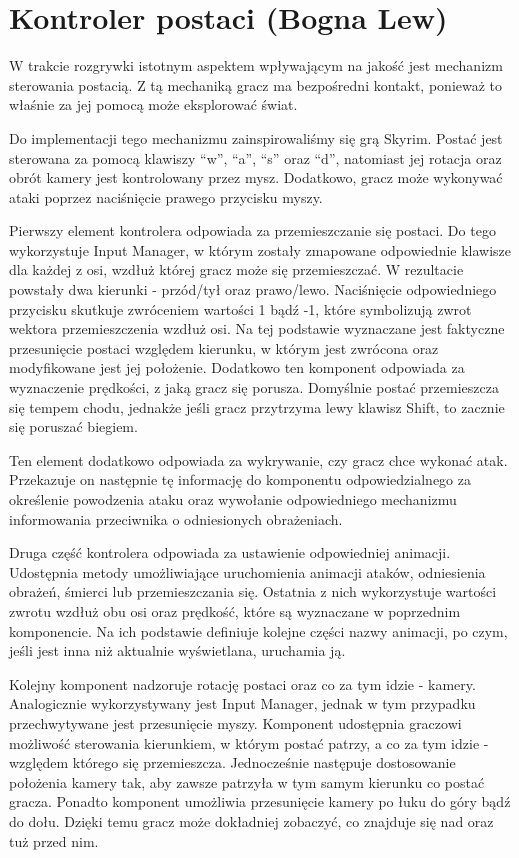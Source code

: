 \section{Kontroler postaci (Bogna Lew)}

W trakcie rozgrywki istotnym aspektem wpływającym na jakość jest mechanizm sterowania postacią. Z tą mechaniką gracz ma
bezpośredni kontakt, ponieważ to właśnie za jej pomocą może eksplorować świat.

Do implementacji tego mechanizmu zainspirowaliśmy się grą Skyrim. Postać jest sterowana za pomocą klawiszy “w”, “a”, “s”
oraz “d”, natomiast jej rotacja oraz obrót kamery jest kontrolowany przez mysz. Dodatkowo, gracz może wykonywać ataki
poprzez naciśnięcie prawego przycisku myszy.

Pierwszy element kontrolera odpowiada za przemieszczanie się postaci. Do tego wykorzystuje Input Manager, w którym zostały
zmapowane odpowiednie klawisze dla każdej z osi, wzdłuż której gracz może się przemieszczać. W rezultacie powstały dwa
kierunki - przód/tył oraz prawo/lewo. Naciśnięcie odpowiedniego przycisku skutkuje zwróceniem wartości 1 bądź -1, które
symbolizują zwrot wektora przemieszczenia wzdłuż osi. Na tej podstawie wyznaczane jest faktyczne przesunięcie postaci
względem kierunku, w którym jest zwrócona oraz modyfikowane jest jej położenie. Dodatkowo ten komponent odpowiada za
wyznaczenie prędkości, z jaką gracz się porusza. Domyślnie postać przemieszcza się tempem chodu, jednakże jeśli gracz
przytrzyma lewy klawisz Shift, to zacznie się poruszać biegiem.

Ten element dodatkowo odpowiada za wykrywanie, czy gracz chce wykonać atak. Przekazuje on następnie tę informację do
komponentu odpowiedzialnego za określenie powodzenia ataku oraz wywołanie odpowiedniego mechanizmu informowania
przeciwnika o odniesionych obrażeniach.

Druga część kontrolera odpowiada za ustawienie odpowiedniej animacji. Udostępnia metody umożliwiające uruchomienia
animacji ataków, odniesienia obrażeń, śmierci lub przemieszczania się. Ostatnia z nich wykorzystuje wartości zwrotu wzdłuż
obu osi oraz prędkość, które są wyznaczane w poprzednim komponencie. Na ich podstawie definiuje kolejne części nazwy
animacji, po czym, jeśli jest inna niż aktualnie wyświetlana, uruchamia ją.

Kolejny komponent nadzoruje rotację postaci oraz co za tym idzie - kamery. Analogicznie wykorzystywany jest Input
Manager, jednak w tym przypadku przechwytywane jest przesunięcie myszy. Komponent udostępnia graczowi możliwość
sterowania kierunkiem, w którym postać patrzy, a co za tym idzie - względem którego się przemieszcza. Jednocześnie
następuje dostosowanie położenia kamery tak, aby zawsze patrzyła w tym samym kierunku co postać gracza. Ponadto
komponent umożliwia przesunięcie kamery po łuku do góry bądź do dołu. Dzięki temu gracz może dokładniej zobaczyć,
co znajduje się nad oraz tuż przed nim.

